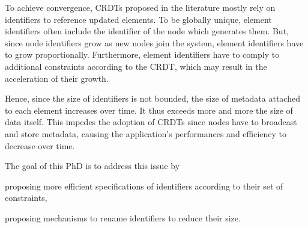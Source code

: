 \documentclass{article}
\begin{document}
To achieve convergence, \acp{CRDT} proposed in the literature mostly rely on identifiers to reference updated elements.
To be globally unique, element identifiers often include the identifier of the node which generates them.
But, since node identifiers grow as new nodes join the system, element identifiers have to grow proportionally.
Furthermore, element identifiers have to comply to additional constraints according to the \ac{CRDT}, which may result in the acceleration of their growth.



Hence, since the size of identifiers is not bounded, the size of metadata attached to each element increases over time.
It thus exceeds more and more the size of data itself.
This impedes the adoption of \acp{CRDT} since nodes have to broadcast and store metadata, causing the application's performances and efficiency to decrease over time.

The goal of this PhD is to address this issue by
\begin{enumerate*}
  \item proposing more efficient specifications of identifiers according to their set of constraints,
  \item proposing mechanisms to rename identifiers to reduce their size.
\end{enumerate*}


\nocite{ShapiroSSS2011}



\end{document}
